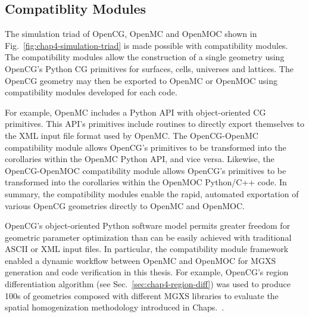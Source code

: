 \subsection{Compatiblity Modules}
\label{sec:chap4-opencg-compatibility}

The simulation triad of OpenCG, OpenMC and OpenMOC shown in Fig.~\ref{fig:chap4-simulation-triad} is made possible with compatibility modules. The compatibility modules allow the construction of a single geometry using OpenCG's Python \ac{CG} primitives for surfaces, cells, universes and lattices. The OpenCG geometry may then be exported to OpenMC or OpenMOC using compatibility modules developed for each code.

For example, OpenMC includes a Python \ac{API} with object-oriented \ac{CG} primitives. This \ac{API}'s primitives include routines to directly export themselves to the \ac{XML} input file format used by OpenMC. The OpenCG-OpenMC compatibility module allows OpenCG's primitives to be transformed into the corollaries within the OpenMC Python \ac{API}, and vice versa. Likewise, the OpenCG-OpenMOC compatibility module allows OpenCG's primitives to be transformed into the corollaries within the OpenMOC Python/C++ code. In summary, the compatibility modules enable the rapid, automated exportation of various OpenCG geometries directly to OpenMC and OpenMOC.

OpenCG's object-oriented Python software model permits greater freedom for geometric parameter optimization than can be easily achieved with traditional \ac{ASCII} or \ac{XML} input files. In particular, the compatibility module framework enabled a dynamic workflow between OpenMC and OpenMOC for \ac{MGXS} generation and code verification in this thesis. For example, OpenCG's region differentiation algorithm (see Sec.~\ref{sec:chap4-region-diff}) was used to produce 100s of geometries composed with different \ac{MGXS} libraries to evaluate the spatial homogenization methodology introduced in Chaps.~.



